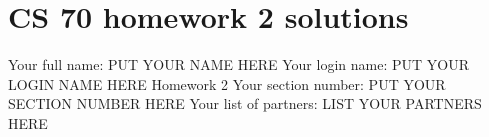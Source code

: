 \documentclass[11pt,fleqn]{article}
\begin{document}
\newcommand{\mbf}[1]{\mbox{{\bfseries #1}}}
\newcommand{\N}{\mbf{N}}
\newtheorem{theorem}{Theorem}
\newtheorem{lemma}{Lemma}
\def\floor#1{\lfloor #1 \rfloor}


\section*{CS 70 homework 2 solutions}

Your full name: PUT YOUR NAME HERE
\newline
Your login name: PUT YOUR LOGIN NAME HERE
\newline
Homework 2
\newline
Your section number: PUT YOUR SECTION NUMBER HERE
\newline
Your list of partners: LIST YOUR PARTNERS HERE
\newline
\end{document}
